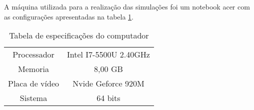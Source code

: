 A máquina utilizada para a realização das simulações foi um notebook acer com as configurações apresentadas na tabela
\ref{tab:note_config}.

\begin{table}
    \begin{center}
    \caption{Tabela de especificações do computador}
    \label{tab:note_config}
    \begin{tabular}{c c}
        \hline
        Processador & Intel I7-5500U 2.40GHz \\
        Memoria & 8,00 GB \\
        Placa de vídeo & Nvide Geforce 920M \\
        Sistema & 64 bits \\ \hline
    \end{tabular}
    \end{center}
\end{table}
